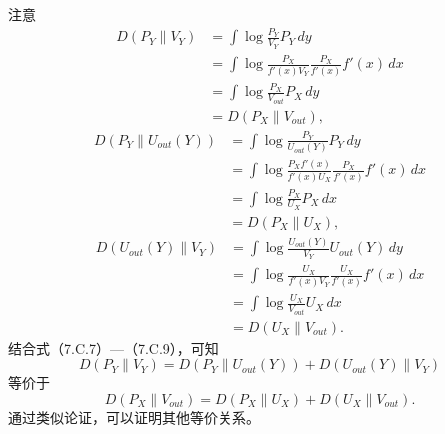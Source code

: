 注意
\begin{equation}
\begin{aligned}
D(P_Y\parallel V_Y)
 &=\int\log\frac{P_Y}{V_Y}P_Y\,dy\\
 &=\int\log\frac{P_X}{f'(x)V_Y}\frac{P_X}{f'(x)}f'(x)\,dx\\
 &=\int\log\frac{P_X}{V_{out}}P_X\,dy\\
 &=D(P_X\parallel V_{out}),
\end{aligned}\tag{7.C.7}
\end{equation}
\begin{equation}
\begin{aligned}
D(P_Y\parallel U_{out}(Y))
 &=\int\log\frac{P_Y}{U_{out}(Y)}P_Y\,dy\\
 &=\int\log\frac{P_Xf'(x)}{f'(x)U_X}\frac{P_X}{f'(x)}f'(x)\,dx\\
 &=\int\log\frac{P_X}{U_X}P_X\,dx\\
 &=D(P_X\parallel U_X),
\end{aligned}\tag{7.C.8}
\end{equation}
\begin{equation}
\begin{aligned}
D(U_{out}(Y)\parallel V_Y)
 &=\int\log\frac{U_{out}(Y)}{V_Y}U_{out}(Y)\,dy\\
 &=\int\log\frac{U_X}{f'(x)V_Y}\frac{U_X}{f'(x)}f'(x)\,dx\\
 &=\int\log\frac{U_X}{V_{out}}U_X\,dx\\
 &=D(U_X\parallel V_{out}).
\end{aligned}\tag{7.C.9}
\end{equation}
结合式（7.C.7）—（7.C.9），可知
\[
D(P_Y\parallel V_Y)=D(P_Y\parallel U_{out}(Y))
 +D(U_{out}(Y)\parallel V_Y)
\]
等价于
\[
D(P_X\parallel V_{out})=D(P_X\parallel U_X)+D(U_X\parallel V_{out}).
\]
通过类似论证，可以证明其他等价关系。
